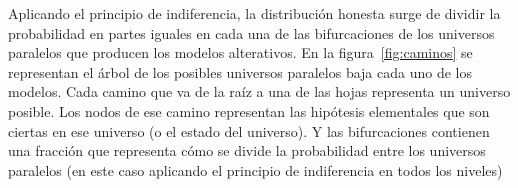 \documentclass[a4paper,11pt]{book}
\theoremstyle{definition}
\begin{document}

Aplicando el principio de indiferencia, la distribución honesta surge de dividir la probabilidad en partes iguales en cada una de las bifurcaciones de los universos paralelos que producen los modelos alterativos.
%
En la figura~\ref{fig:caminos} se representan el árbol de los posibles universos paralelos baja  cada uno de los modelos.
%
Cada camino que va de la ra\'iz a una de las hojas representa un universo posible.
%
Los nodos de ese camino representan las hipótesis elementales que son ciertas en ese universo (o el estado del universo).
%
Y las bifurcaciones contienen una fracción que representa cómo se divide la probabilidad entre los universos paralelos (en este caso aplicando el principio de indiferencia en todos los niveles)

%
\end{document}
